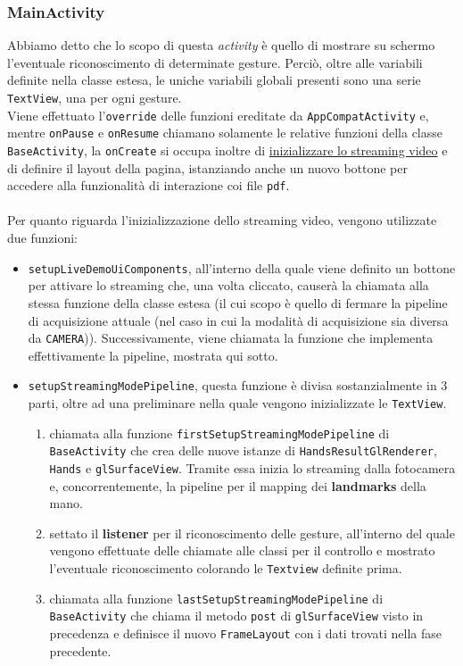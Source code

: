 \subsubsection{MainActivity}
Abbiamo detto che lo scopo di questa \textit{activity} è quello di mostrare su schermo l'eventuale riconoscimento di determinate gesture. Perciò, oltre alle variabili definite nella classe estesa, le uniche variabili globali presenti sono una serie \texttt{TextView}, una per ogni gesture.\\
Viene effettuato l'\texttt{override} delle funzioni ereditate da \texttt{AppCompatActivity} e, mentre \texttt{onPause} e \texttt{onResume} chiamano solamente le relative funzioni della classe \texttt{BaseActivity}, la \texttt{onCreate} si occupa inoltre di \underline{inizializzare lo streaming video} e di definire il layout della pagina, istanziando anche un nuovo bottone per accedere alla funzionalità di interazione coi file \texttt{pdf}.\\
\\
Per quanto riguarda l'inizializzazione dello streaming video, vengono utilizzate due funzioni:
\begin{itemize}
    \item \texttt{setupLiveDemoUiComponents}, all'interno della quale viene definito un bottone per attivare lo streaming che, una volta cliccato, causerà la chiamata alla stessa funzione della classe estesa (il cui scopo è quello di fermare la pipeline di acquisizione attuale (nel caso in cui la modalità di acquisizione sia diversa da \texttt{CAMERA})). Successivamente, viene chiamata la funzione che implementa effettivamente la pipeline, mostrata qui sotto.
    \item \texttt{setupStreamingModePipeline}, questa funzione è divisa sostanzialmente in 3 parti, oltre ad una preliminare nella quale vengono inizializzate le \texttt{TextView}. \begin{enumerate}
        \item chiamata alla funzione \texttt{firstSetupStreamingModePipeline} di \texttt{BaseActivity} che crea delle nuove istanze di \texttt{HandsResultGlRenderer}, \texttt{Hands} e \texttt{glSurfaceView}. Tramite essa inizia lo streaming dalla fotocamera e, concorrentemente, la pipeline per il mapping dei \textbf{landmarks} della mano.
        \item settato il \textbf{listener} per il riconoscimento delle gesture, all'interno del quale vengono effettuate delle chiamate alle classi per il controllo e mostrato l'eventuale riconoscimento colorando le \texttt{Textview} definite prima.
        \item chiamata alla funzione \texttt{lastSetupStreamingModePipeline} di \texttt{BaseActivity} che chiama il metodo \texttt{post} di \texttt{glSurfaceView} visto in precedenza e definisce il nuovo \texttt{FrameLayout} con i dati trovati nella fase precedente.
    \end{enumerate}
\end{itemize}


